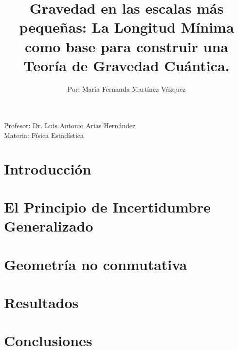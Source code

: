 \documentclass{article}
\date{}
\title{
\textbf{Gravedad en las escalas más pequeñas: La Longitud Mínima como base para construir una Teoría de Gravedad Cuántica.}
}
\author{Por: 
Maria Fernanda Martínez Vázquez}
\begin{document}
\vspace{-3pt}
\maketitle
\begin{center}
\vspace{-48pt}
     Profesor: Dr. Luis Antonio Arias Hernández\\
     Materia: Física Estadística   

\end{center}



\section*{Introducción}



\section*{El Principio de Incertidumbre Generalizado}



\section*{Geometría no conmutativa}



\section*{Resultados}



\section*{Conclusiones}


\end{document}
